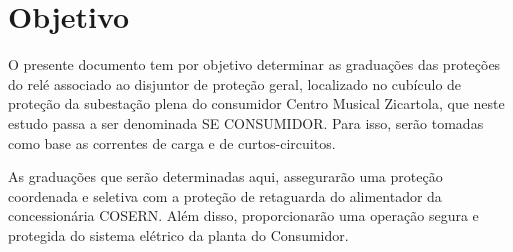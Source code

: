 \section{Objetivo}

O presente documento tem por objetivo determinar as graduações das proteções do relé associado ao disjuntor de proteção geral, localizado no cubículo de proteção da subestação plena do consumidor Centro Musical Zicartola, que neste estudo passa a ser denominada SE CONSUMIDOR. Para isso, serão tomadas como base as correntes de carga e de curtos-circuitos. 

As graduações que serão determinadas aqui, assegurarão uma proteção coordenada e seletiva com a proteção de retaguarda do alimentador da concessionária COSERN. Além disso, proporcionarão uma operação segura e protegida do sistema elétrico da planta do Consumidor.